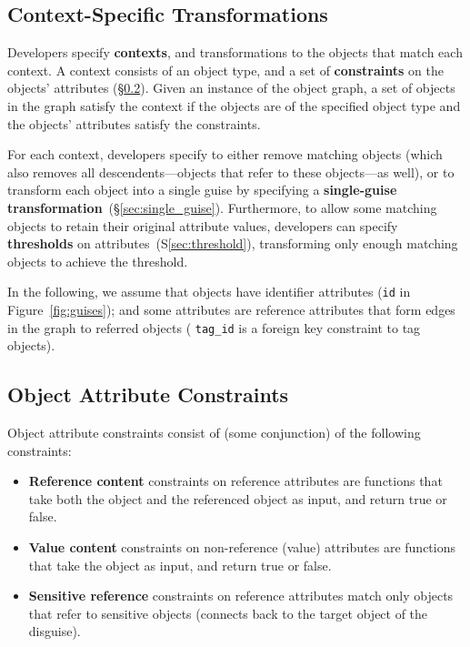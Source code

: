 \subsection{Context-Specific Transformations}
\label{sec:context}

Developers specify \textbf{contexts}, and transformations to the objects that match each context. 
%
%
%
A context consists of an object type, and a set of \textbf{constraints} on the objects' attributes
(\S\ref{sec:constraints}).
Given an instance of the object graph, a set of objects in the graph
satisfy the context if the objects are of the specified object type and the objects'
attributes satisfy the constraints.

For each context, developers specify to either remove matching objects (which also removes all
descendents---objects that refer to these objects---as well), or to transform each object into
a single guise by specifying a \textbf{single-guise transformation}~(\S\ref{sec:single_guise}). 
Furthermore, to allow some matching objects to retain their original attribute values, 
developers can specify \textbf{thresholds} on attributes~(S\ref{sec:threshold}), transforming
only enough matching objects to achieve the threshold.

%
In the following, we assume that objects have identifier attributes (\eg \texttt{id} in Figure~\ref{fig:guises}); and
some attributes are reference attributes that form edges in the graph to referred objects (\eg
\texttt{tag\_id} is a foreign key constraint to tag objects).

\subsection{Object Attribute Constraints}
\label{sec:constraints} 

Object attribute constraints consist of (some conjunction) of the following constraints:
\begin{itemize}[nosep]
\item \textbf{Reference content} constraints on reference attributes are functions that
    take both the object and the referenced object as input, and return true or false. 
\item \textbf{Value content} constraints on non-reference (value) attributes are functions that take the object as
input, and return true or false.  
\item \textbf{Sensitive reference} constraints on reference attributes match only objects that refer
    to sensitive objects (\ie connects back to the target object of the disguise).
\end{itemize}

